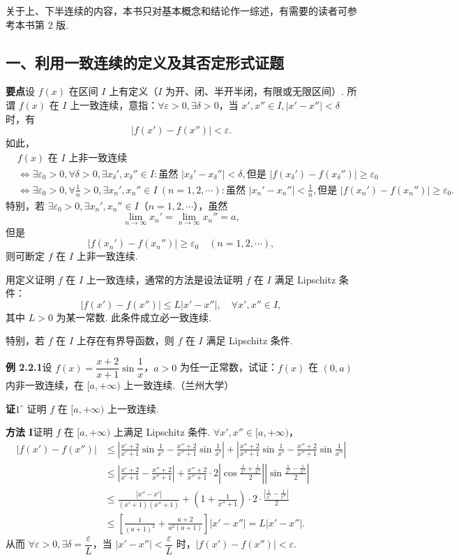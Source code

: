 \documentclass[UTF8, 12pt, fontset=fandol, oneside]{ctexart}
\begin{document}
关于上、下半连续的内容，本书只对基本概念和结论作一综述，有需要的读者可参考本书第 2 版.

\subsection*{一、利用一致连续的定义及其否定形式证题}

\noindent\textbf{要点}\quad 设 $f(x)$ 在区间 $I$ 上有定义（$I$ 为开、闭、半开半闭，有限或无限区间）. 所谓 $f(x)$ 在 $I$ 上一致连续，意指：$\forall\varepsilon>0,\exists\delta>0$，当 $x',x''\in I,|x'-x''|<\delta$ 时，有
\[
  |f(x')-f(x'')|<\varepsilon.
\]
如此，
\[
\begin{aligned}
&f(x)\text{ 在 }I\text{ 上非一致连续}\\
&\Leftrightarrow \exists\varepsilon_0>0,\forall\delta>0,\exists x_\delta',x_\delta''\in I:
  \text{虽然 }|x_\delta'-x_\delta''|<\delta,\text{但是 }|f(x_\delta')-f(x_\delta'')|\ge\varepsilon_0\\
&\Leftrightarrow \exists\varepsilon_0>0,\forall\frac1n>0,\exists x_n',x_n''\in I\ (n=1,2,\cdots):
  \text{虽然 }|x_n'-x_n''|<\frac1n,\text{但是 }|f(x_n')-f(x_n'')|\ge\varepsilon_0.
\end{aligned}
\]
特别，若 $\exists\varepsilon_0>0,\exists x_n',x_n''\in I$（$n=1,2,\cdots$），虽然
\[
  \lim_{n\to\infty}x_n'=\lim_{n\to\infty}x_n''=a,
\]
但是
\[
  |f(x_n')-f(x_n'')|\ge\varepsilon_0\quad(n=1,2,\cdots),
\]
则可断定 $f$ 在 $I$ 上非一致连续.

用定义证明 $f$ 在 $I$ 上一致连续，通常的方法是设法证明 $f$ 在 $I$ 满足 Lipschitz 条件：
\[
  |f(x')-f(x'')|\le L|x'-x''|,\quad \forall x',x''\in I,
\]
其中 $L>0$ 为某一常数. 此条件成立必一致连续.

特别，若 $f$ 在 $I$ 上存在有界导函数，则 $f$ 在 $I$ 满足 Lipschitz 条件.

\noindent\textbf{例 2.2.1}\quad 设 $f(x)=\dfrac{x+2}{x+1}\sin\dfrac1x$，$a>0$ 为任一正常数，试证：$f(x)$ 在 $(0,a)$ 内非一致连续，在 $[a,+\infty)$ 上一致连续.（兰州大学）

\noindent\textbf{证}\quad $1^\circ$ 证明 $f$ 在 $[a,+\infty)$ 上一致连续.

\noindent\textbf{方法 I}\quad 证明 $f$ 在 $[a,+\infty)$ 上满足 Lipschitz 条件. $\forall x',x''\in[a,+\infty)$，
\[
\begin{aligned}
|f(x')-f(x'')|
&\le \left|\frac{x'+2}{x'+1}\sin\frac1{x'}-\frac{x''+2}{x''+1}\sin\frac1{x'}\right|
 +\left|\frac{x''+2}{x''+1}\sin\frac1{x'}-\frac{x''+2}{x''+1}\sin\frac1{x''}\right|\\
&\le \left|\frac{x'+2}{x'+1}-\frac{x''+2}{x''+1}\right|
 +\frac{x''+2}{x''+1}\cdot2
 \left|\cos\frac{\frac1{x'}+\frac1{x''}}2\right|
 \left|\sin\frac{\frac1{x'}-\frac1{x''}}2\right|\\
&\le \frac{|x''-x'|}{(x'+1)(x''+1)}
 +\left(1+\frac1{x''+1}\right)\cdot2\cdot\frac{\left|\frac1{x'}-\frac1{x''}\right|}{2}\\
&\le \left[\frac1{(a+1)^2}+\frac{a+2}{a^2(a+1)}\right]|x'-x''|
 =L|x'-x''|.
\end{aligned}
\]
从而 $\forall\varepsilon>0,\exists\delta=\dfrac\varepsilon L$，当 $|x'-x''|<\dfrac\varepsilon L$ 时，$|f(x')-f(x'')|<\varepsilon$.
\end{document}
